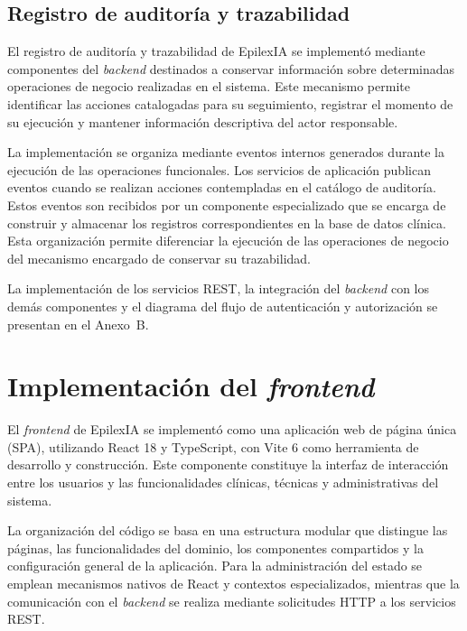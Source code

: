 \subsection{Registro de auditoría y trazabilidad}

El registro de auditoría y trazabilidad de EpilexIA se implementó mediante componentes del \textit{backend} destinados a conservar información sobre determinadas operaciones de negocio realizadas en el sistema. Este mecanismo permite identificar las acciones catalogadas para su seguimiento, registrar el momento de su ejecución y mantener información descriptiva del actor responsable.

La implementación se organiza mediante eventos internos generados durante la ejecución de las operaciones funcionales. Los servicios de aplicación publican eventos cuando se realizan acciones contempladas en el catálogo de auditoría. Estos eventos son recibidos por un componente especializado que se encarga de construir y almacenar los registros correspondientes en la base de datos clínica. Esta organización permite diferenciar la ejecución de las operaciones de negocio del mecanismo encargado de conservar su trazabilidad.

\begin{nuevotexto}
La implementación de los servicios REST, la integración del \textit{backend} con los demás componentes y el diagrama del flujo de autenticación y autorización se presentan en el Anexo~B.
\end{nuevotexto}

\section{Implementación del \textit{frontend}}

El \textit{frontend} de EpilexIA se implementó como una
aplicación web de página única (SPA), utilizando
React 18 y TypeScript, con Vite 6 como herramienta
de desarrollo y construcción. Este componente
constituye la interfaz de interacción entre los
usuarios y las funcionalidades clínicas, técnicas
y administrativas del sistema.

La organización del código se basa en una
estructura modular que distingue las páginas,
las funcionalidades del dominio, los componentes
compartidos y la configuración general de la
aplicación. Para la administración del estado
se emplean mecanismos nativos de React y
contextos especializados, mientras que la
comunicación con el \textit{backend} se realiza mediante
solicitudes HTTP a los servicios REST.

